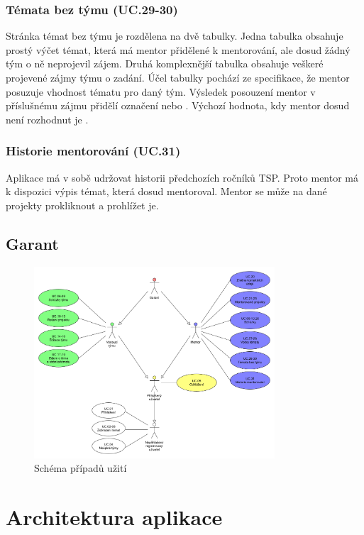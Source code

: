 \documentclass[czech,BP]{thesiskiv}
\begin{document}
			\subsubsection{Témata bez týmu (UC.29-30)}
				\par Stránka témat bez týmu je rozdělena na dvě tabulky. Jedna tabulka obsahuje prostý výčet témat, která má mentor přidělené k mentorování, ale dosud žádný tým o ně neprojevil zájem. Druhá komplexnější tabulka obsahuje veškeré projevené zájmy týmu o zadání. Účel tabulky pochází ze specifikace, že mentor posuzuje vhodnost tématu pro daný tým. Výsledek posouzení mentor v příslušnému zájmu přidělí označení  nebo . Výchozí hodnota, kdy mentor dosud není rozhodnut je .
			\subsubsection{Historie mentorování (UC.31)}
				\par Aplikace má v sobě udržovat historii předchozích ročníků TSP. Proto mentor má k dispozici výpis témat, která dosud mentoroval. Mentor se může na dané projekty prokliknout a prohlížet je.
		\subsection{Garant}
		\begin{figure}[h]
			\centering
			\includegraphics[width=0.8\textwidth]{img/use_case/use_case_diagram}
			\caption{Schéma případů užití}
		\end{figure}
	\section{Architektura aplikace}
\end{document}
